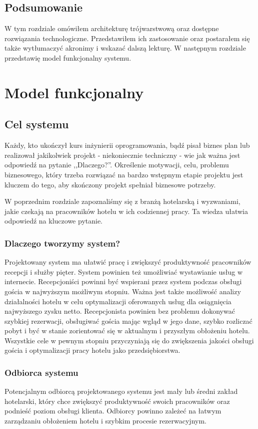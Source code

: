 \documentclass[a4paper,onecolumn,oneside,11pt,wide,floatssmall]{mwrep}
\theoremstyle{definition}
\theoremstyle{plain}%
\theoremstyle{remark}
\begin{document}
\section{Podsumowanie}
W tym rozdziale omówiłem architekturę trójwarstwową oraz dostępne rozwiązania technologiczne. Przedstawiłem ich zastosowanie oraz postarałem się także wytłumaczyć akronimy i wskazać dalszą lekturę. W następnym rozdziale przedstawię model funkcjonalny systemu.

\chapter{Model funkcjonalny}
\label{wymagania}
\section{Cel systemu}
Każdy, kto ukończył kurs inżynierii oprogramowania, bądź pisał biznes plan lub realizował jakikolwiek projekt - niekoniecznie techniczny -  
 wie jak ważna jest odpowiedź na pytanie ,,Dlaczego?''. Określenie motywacji, celu, problemu biznesowego, który trzeba 
 rozwiązać na bardzo wstępnym etapie projektu jest kluczem do tego, aby skończony projekt spełniał biznesowe potrzeby.

W poprzednim rozdziale zapoznaliśmy się z branżą hotelarską i wyzwaniami, jakie czekają na pracowników hotelu w ich 
codziennej pracy. Ta wiedza ułatwia odpowiedź na kluczowe pytanie.

\subsection{Dlaczego tworzymy system?}
Projektowany system ma ułatwić pracę i zwiększyć produktywność pracowników recepcji i służby pięter. System powinien też umożliwiać wystawianie usług w internecie. Recepcjoniści powinni być wspierani przez system podczas obsługi gościa w 
najwyższym możliwym stopniu. Ważna jest także możliwość analizy działalności hotelu w celu optymalizacji oferowanych 
usług dla osiągnięcia najwyższego zysku netto. Recepcjonista powinien bez problemu dokonywać szybkiej rezerwacji, 
obsługiwać gościa mając wgląd w jego dane, szybko rozliczać pobyt i być w stanie zorientować się w aktualnym i 
przyszłym obłożeniu hotelu. Wszystkie cele w pewnym stopniu przyczyniają się do zwiększenia jakości obsługi gościa i 
optymalizacji pracy hotelu jako przedsiębiorstwa.

\subsection{Odbiorca systemu}
Potencjalnym odbiorcą projektowanego systemu jest mały lub średni zakład hotelarski, który chce zwiększyć produktywność swoich pracowników oraz podnieść poziom obsługi klienta. Odbiorcy powinno zależeć na łatwym zarządzaniu obłożeniem hotelu i szybkim procesie rezerwacyjnym.
\end{document}
